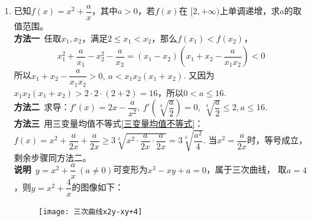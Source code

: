 \begin{enumerate}[label={【\textbf{例\thechapter.\arabic*}】},
 leftmargin=\inteval{\myenumleftmargin}pt,
 itemsep=\inteval{\myenumitempsep}pt,
 itemindent=\inteval{\myenumitemindent}pt]
\item 已知$ f(x)=x^2+\dfrac{a}{x} $，其中$ a>0 $，若$ f(x) $在
$ [2,+\infty) $上单调递增，求$ a $的取值范围。 \\
\textbf{方法一}\ 任取$ x_1,x_2 $，满足$ 2\leq x_1<x_2 $，那么$ f(x_1)<f(x_2) $，
\begin{align*}
    x_1^2+\dfrac{a}{x_1}-x_2^2-\dfrac{a}{x_2} 
    =(x_1-x_2)\left(x_1+x_2-\dfrac{a}{x_1x_2} \right) <0 
\end{align*} 
所以$ x_1+x_2-\dfrac{a}{x_1x_2}>0,\ a<x_1x_2(x_1+x_2) $. 又因为
$ x_1x_2(x_1+x_2)>2\cdot 2 \cdot(2+2)=16 $，所以$ 0<a\leq 16 $. \\
\textbf{方法二}\ 求导：$ f'(x)=2x-\dfrac{a}{x^2},\ f'\left(\sqrt[3]{
    \dfrac{a}{2}} \right)=0,\ \sqrt[3]{\dfrac{a}{2}}\leq 2,a\leq 16 $. \\
\textbf{方法三}\ 用三变量均值不等式\eqref{三变量均值不等式}：
$ f(x)=x^2+\dfrac{a}{2x}+\dfrac{a}{2x} 
\geq 3\sqrt[3]{x^2\cdot\dfrac{a}{2x}\cdot\dfrac{a}{2x}}=
3\sqrt[3]{\dfrac{a^2}{4}} $. 当$ x^2=\dfrac{a}{2x} $时，等号成立，
剩余步骤同方法二。 \\
\textbf{说明}\ $ y=x^2+\dfrac{a}{x}\ (a\neq 0) $可变形为$ x^3-xy+a=0 $，属于三次曲线，
取$ a=4 $，则$ y=x^2+\dfrac{4}{x} $的图像如下：\\
\begin{figure}[h] %
    \centering
    \texttt{[image: 三次曲线x2y-xy+4]}
\end{figure} 


\end{enumerate}
